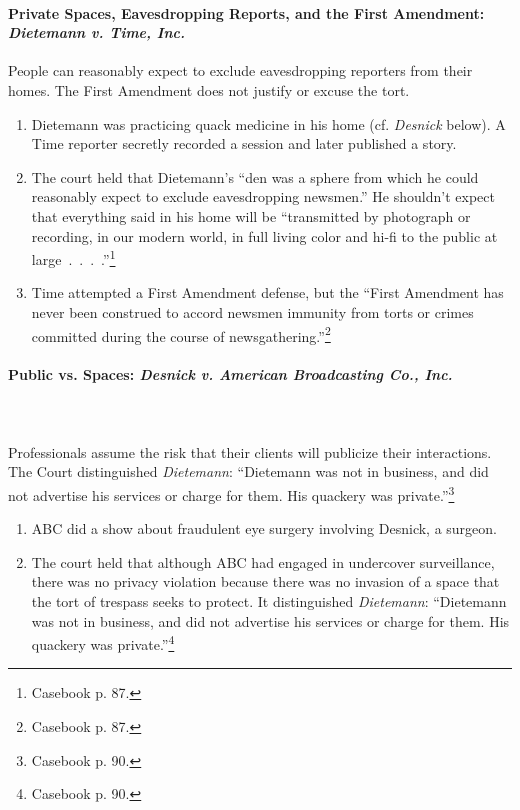 \paragraph{Private Spaces, Eavesdropping Reports, and the First Amendment: 
\emph{Dietemann v. Time, Inc.}}

People can reasonably expect to exclude eavesdropping reporters from their 
homes. The First Amendment does not justify or excuse the tort.

\begin{enumerate}
    \item Dietemann was practicing quack medicine in his home (cf.  
    \emph{Desnick} below). A Time reporter secretly recorded a session and later 
    published a story.
    \item The court held that Dietemann's ``den was a sphere from which he could 
    reasonably expect to exclude eavesdropping newsmen.'' He shouldn't expect 
    that everything said in his home will be ``transmitted by photograph or 
    recording, in our modern world, in full living color and hi-fi to the public 
    at large~.~.~.~.''\footnote{Casebook p. 87.}
    \item Time attempted a First Amendment defense, but the ``First Amendment 
    has never been construed to accord newsmen immunity from torts or crimes 
    committed during the course of newsgathering.''\footnote{Casebook p. 87.}
\end{enumerate}

\paragraph{Public vs. Spaces: \emph{Desnick v. American Broadcasting Co., Inc.}}
~\\\\
Professionals assume the risk that their clients will publicize their 
interactions. The Court distinguished \emph{Dietemann}: ``Dietemann was not in 
business, and did not advertise his services or charge for them. His quackery 
was private.''\footnote{Casebook p. 90.}

\begin{enumerate}
    \item ABC did a show about fraudulent eye surgery involving Desnick, a 
    surgeon.
    \item The court held that although ABC had engaged in undercover 
    surveillance, there was no privacy violation because there was no invasion 
    of a space that the tort of trespass seeks to protect. It distinguished 
    \emph{Dietemann}: ``Dietemann was not in business, and did not advertise his 
    services or charge for them. His quackery was private.''\footnote{Casebook 
    p. 90.}
\end{enumerate}

